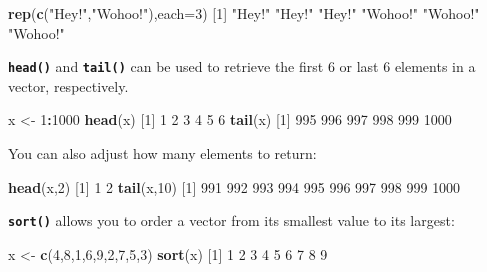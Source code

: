 \documentclass[]{book}
\newenvironment{Shaded}{\begin{snugshade}}{\end{snugshade}}
\newcommand{\DataTypeTok}[1]{\textcolor[rgb]{0.13,0.29,0.53}{#1}}
\newcommand{\DecValTok}[1]{\textcolor[rgb]{0.00,0.00,0.81}{#1}}
\newcommand{\KeywordTok}[1]{\textcolor[rgb]{0.13,0.29,0.53}{\textbf{#1}}}
\newcommand{\NormalTok}[1]{#1}
\newcommand{\OperatorTok}[1]{\textcolor[rgb]{0.81,0.36,0.00}{\textbf{#1}}}
\newcommand{\StringTok}[1]{\textcolor[rgb]{0.31,0.60,0.02}{#1}}
\begin{document}
\begin{Shaded}
\begin{Highlighting}[]
\KeywordTok{rep}\NormalTok{(}\KeywordTok{c}\NormalTok{(}\StringTok{"Hey!"}\NormalTok{,}\StringTok{"Wohoo!"}\NormalTok{),}\DataTypeTok{each=}\DecValTok{3}\NormalTok{)}
\NormalTok{[}\DecValTok{1}\NormalTok{] }\StringTok{"Hey!"}   \StringTok{"Hey!"}   \StringTok{"Hey!"}   \StringTok{"Wohoo!"} \StringTok{"Wohoo!"} \StringTok{"Wohoo!"}
\end{Highlighting}
\end{Shaded}

\textbf{\texttt{head()}} and \textbf{\texttt{tail()}} can be used to retrieve the first 6 or last 6 elements in a vector, respectively.

\begin{Shaded}
\begin{Highlighting}[]
\NormalTok{x <-}\StringTok{ }\DecValTok{1}\OperatorTok{:}\DecValTok{1000}
\KeywordTok{head}\NormalTok{(x)}
\NormalTok{[}\DecValTok{1}\NormalTok{] }\DecValTok{1} \DecValTok{2} \DecValTok{3} \DecValTok{4} \DecValTok{5} \DecValTok{6}
\KeywordTok{tail}\NormalTok{(x)}
\NormalTok{[}\DecValTok{1}\NormalTok{]  }\DecValTok{995}  \DecValTok{996}  \DecValTok{997}  \DecValTok{998}  \DecValTok{999} \DecValTok{1000}
\end{Highlighting}
\end{Shaded}

You can also adjust how many elements to return:

\begin{Shaded}
\begin{Highlighting}[]
\KeywordTok{head}\NormalTok{(x,}\DecValTok{2}\NormalTok{)}
\NormalTok{[}\DecValTok{1}\NormalTok{] }\DecValTok{1} \DecValTok{2}
\KeywordTok{tail}\NormalTok{(x,}\DecValTok{10}\NormalTok{)}
\NormalTok{ [}\DecValTok{1}\NormalTok{]  }\DecValTok{991}  \DecValTok{992}  \DecValTok{993}  \DecValTok{994}  \DecValTok{995}  \DecValTok{996}  \DecValTok{997}  \DecValTok{998}  \DecValTok{999} \DecValTok{1000}
\end{Highlighting}
\end{Shaded}

\textbf{\texttt{sort()}} allows you to order a vector from its smallest value to its largest:

\begin{Shaded}
\begin{Highlighting}[]
\NormalTok{x <-}\StringTok{ }\KeywordTok{c}\NormalTok{(}\DecValTok{4}\NormalTok{,}\DecValTok{8}\NormalTok{,}\DecValTok{1}\NormalTok{,}\DecValTok{6}\NormalTok{,}\DecValTok{9}\NormalTok{,}\DecValTok{2}\NormalTok{,}\DecValTok{7}\NormalTok{,}\DecValTok{5}\NormalTok{,}\DecValTok{3}\NormalTok{)}
\KeywordTok{sort}\NormalTok{(x)}
\NormalTok{[}\DecValTok{1}\NormalTok{] }\DecValTok{1} \DecValTok{2} \DecValTok{3} \DecValTok{4} \DecValTok{5} \DecValTok{6} \DecValTok{7} \DecValTok{8} \DecValTok{9}
\end{Highlighting}
\end{Shaded}
\end{document}
